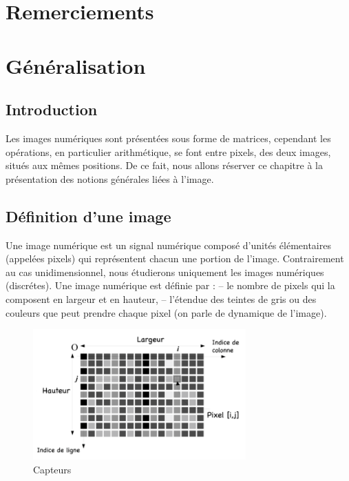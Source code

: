 \documentclass[12pt,a4paper]{report}
\numberwithin{equation}{subsection}
\numberwithin{equation}{section}
\begin{document}
\chapter*{Remerciements}

\tableofcontents
\chapter{Généralisation}
\section{Introduction}
Les images numériques sont présentées sous forme de matrices, cependant les
opérations, en particulier arithmétique, se font entre pixels, des deux images, situés aux
mêmes positions.
De ce fait, nous allons réserver ce chapitre à la présentation des notions générales liées
à l’image.
\section{Définition d’une image}

Une image numérique est un signal numérique composé d’unités élémentaires (appelées pixels) qui représentent chacun une portion de l’image. Contrairement au cas unidimensionnel, nous étudierons uniquement les images numériques (discrétes). \newline Une image numérique est déﬁnie par : \newline– le nombre de pixels qui la composent en largeur et en hauteur, \newline– l’étendue des teintes de gris ou des couleurs que peut prendre chaque pixel (on parle de dynamique de l’image).
\begin{figure}[!h]
    \centering
    \begin{center}
        \includegraphics[height=5cm,width=10cm\textwidth]{imagenum.png}
    \end{center}
    \caption{Capteurs}
\end{figure}
\end{document}
